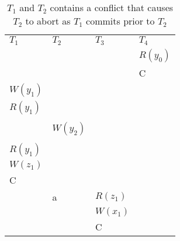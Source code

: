 \begin{table}[h!]
    \begin{tabular}{l|l|l|l}
        $T_1$            & $T_2$            & $T_3$   & $T_4$   \\
        &      &      & $R(y_0)$ \\
        &      &      & C    \\
        $W(y_1)$ &      &      &      \\
        $R(y_1)$ &      &      &      \\
        &      &      &      \\
        & $W(y_2)$ &      &      \\
        &      &      &      \\
        $R(y_1)$ &      &      &      \\
        $W(z_1)$ &      &      &      \\
        C    &      &      &      \\
        & a    & $R(z_1)$ &      \\
        &      & $W(x_1)$ &      \\
        &      & C    &
    \end{tabular}
    \caption{$T_1$ and $T_2$ contains a conflict that causes $T_2$ to abort as $T_1$ commits prior to $T_2$}
\end{table}